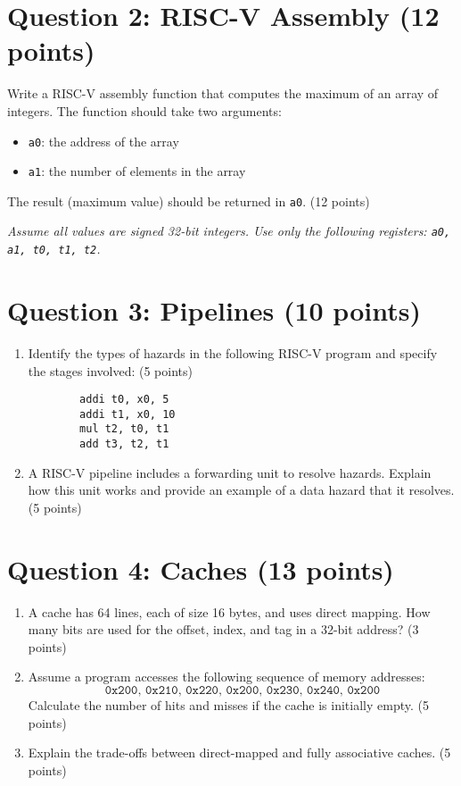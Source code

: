 \documentclass[11pt]{article}
\begin{document}
\section*{Question 2: RISC-V Assembly (12 points)}
Write a RISC-V assembly function that computes the maximum of an array of integers. The function should take two arguments:
\begin{itemize}[noitemsep]
    \item \texttt{a0}: the address of the array
    \item \texttt{a1}: the number of elements in the array
\end{itemize}
The result (maximum value) should be returned in \texttt{a0}. (12 points)

\textit{Assume all values are signed 32-bit integers. Use only the following registers: \texttt{a0, a1, t0, t1, t2}.}

\section*{Question 3: Pipelines (10 points)}
\begin{enumerate}[label=\textbf{Q3.\arabic*}]
    \item Identify the types of hazards in the following RISC-V program and specify the stages involved: (5 points)
    \begin{verbatim}
        addi t0, x0, 5
        addi t1, x0, 10
        mul t2, t0, t1
        add t3, t2, t1
    \end{verbatim}
    \item A RISC-V pipeline includes a forwarding unit to resolve hazards. Explain how this unit works and provide an example of a data hazard that it resolves. (5 points)
\end{enumerate}

\section*{Question 4: Caches (13 points)}
\begin{enumerate}[label=\textbf{Q4.\arabic*}]
    \item A cache has 64 lines, each of size 16 bytes, and uses direct mapping. How many bits are used for the offset, index, and tag in a 32-bit address? (3 points)
    \item Assume a program accesses the following sequence of memory addresses: 
    \[
    \texttt{0x200, 0x210, 0x220, 0x200, 0x230, 0x240, 0x200}
    \]
    Calculate the number of hits and misses if the cache is initially empty. (5 points)
    \item Explain the trade-offs between direct-mapped and fully associative caches. (5 points)
\end{enumerate}
\end{document}
